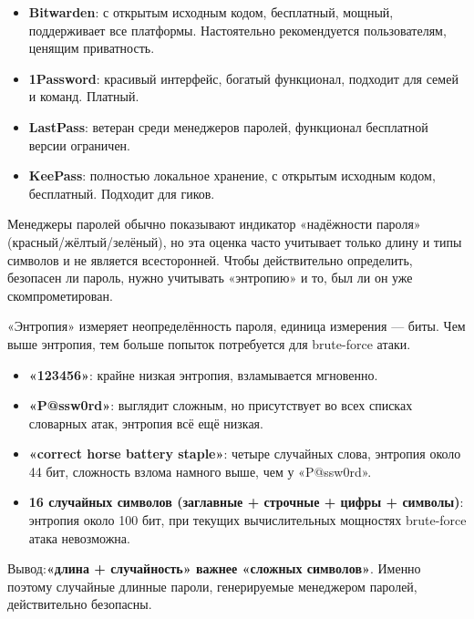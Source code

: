 
\begin{itemize}
  \item \textbf{Bitwarden}: с открытым исходным кодом, бесплатный, мощный, поддерживает все платформы. Настоятельно рекомендуется пользователям, ценящим приватность.
  \item \textbf{1Password}: красивый интерфейс, богатый функционал, подходит для семей и команд. Платный.
  \item \textbf{LastPass}: ветеран среди менеджеров паролей, функционал бесплатной версии ограничен.
  \item \textbf{KeePass}: полностью локальное хранение, с открытым исходным кодом, бесплатный. Подходит для гиков.
\end{itemize}


Менеджеры паролей обычно показывают индикатор «надёжности пароля» (красный/жёлтый/зелёный), но эта оценка часто учитывает только длину и типы символов и не является всесторонней. Чтобы действительно определить, безопасен ли пароль, нужно учитывать «энтропию» и то, был ли он уже скомпрометирован.


«Энтропия» измеряет неопределённость пароля, единица измерения — биты. Чем выше энтропия, тем больше попыток потребуется для brute-force атаки.

\begin{itemize}
  \item \textbf{«123456»}: крайне низкая энтропия, взламывается мгновенно.
  \item \textbf{«P@ssw0rd»}: выглядит сложным, но присутствует во всех списках словарных атак, энтропия всё ещё низкая.
  \item \textbf{«correct horse battery staple»}: четыре случайных слова, энтропия около 44 бит, сложность взлома намного выше, чем у «P@ssw0rd».
  \item \textbf{16 случайных символов (заглавные + строчные + цифры + символы)}: энтропия около 100 бит, при текущих вычислительных мощностях brute-force атака невозможна.
\end{itemize}

Вывод:\textbf{«длина + случайность» важнее «сложных символов»}. Именно поэтому случайные длинные пароли, генерируемые менеджером паролей, действительно безопасны.

